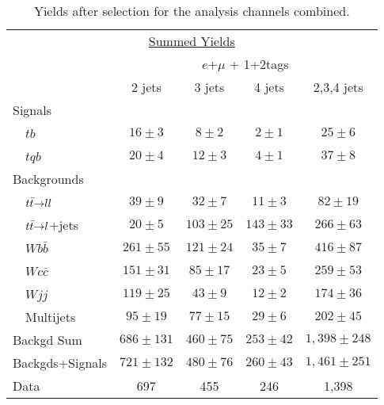 \begin{table}[!h!tbp]
\begin{center}
\begin{minipage}{4.5in}
\begin{ruledtabular}
\begin{tabular}{l|cccc}
\multicolumn{5}{c}{\hspace{1in}\underline{Summed Yields}} \vspace{0.05in} \\
& \multicolumn{4}{c}{$e$+$\mu$ + 1+2tags} \\
                         &    2 jets    &    3 jets    &    4 jets    &    2,3,4 jets   \\
\hline			                                              		  
Signals                  &              &              &              &                 \\
~~$tb$                   &  $16 \pm 3$  &   $8 \pm 2$  &   $2 \pm 1$  &    $25 \pm 6$   \\
~~$tqb$                  &  $20 \pm 4$  &  $12 \pm 3$  &   $4 \pm 1$  &    $37 \pm 8$   \\
Backgrounds              &              &              &              &                 \\
~~${\mbox{$t\bar{t}$}}{\rightarrow}ll$     &  $39 \pm 9$  &  $32 \pm 7$  &  $11 \pm 3$  &    $82 \pm 19$  \\
~~${\mbox{$t\bar{t}$}}{\rightarrow}l$+jets &  $20 \pm 5$  & $103 \pm 25$ & $143 \pm 33$ &   $266 \pm 63$  \\
~~$Wb\bar{b}$            & $261 \pm 55$ & $121 \pm 24$ &  $35 \pm 7$  &   $416 \pm 87$  \\
~~$Wc\bar{c}$            & $151 \pm 31$ &  $85 \pm 17$ &  $23 \pm 5$  &   $259 \pm 53$  \\
~~$Wjj$                  & $119 \pm 25$ &  $43 \pm 9$  &  $12 \pm 2$  &   $174 \pm 36$  \\
~~Multijets              &  $95 \pm 19$ &  $77 \pm 15$ &  $29 \pm 6$  &   $202 \pm 45$  \\
Backgd Sum               & $686 \pm131$ & $460 \pm 75$ & $253 \pm 42$ & $1,398 \pm 248$ \\
Backgds+Signals          & $721 \pm132$ & $480 \pm 76$ & $260 \pm 43$ & $1,461 \pm 251$ \\
Data                     &      697     &      455     &      246     &       1,398     
\end{tabular}
\end{ruledtabular}
\vspace{-0.1in}
\caption[allchansyields]{Yields after selection for the analysis
channels combined.}
\label{allchans-yields}
\end{minipage}
\end{center}
\end{table}

